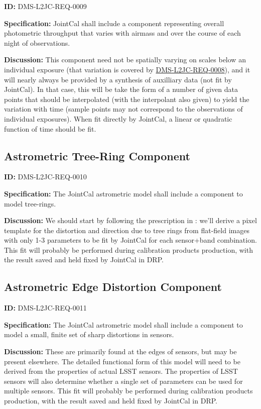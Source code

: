 \documentclass[SE,toc,lsstdraft]{lsstdoc}
\begin{document}
\label{DMS-L2JC-REQ-0009}
\textbf{ID:} DMS-L2JC-REQ-0009

\textbf{Specification:}
JointCal shall include a component representing overall photometric throughput that varies with airmass and over the course of each night of observations.

\textbf{Discussion:}
This component need not be spatially varying on scales below an individual exposure (that variation is covered by \hyperref[DMS-L2JC-REQ-0008]{DMS-L2JC-REQ-0008}), and it will nearly always be provided by a synthesis of auxilliary data (not fit by JointCal).  In that case, this will be take the form of a number of given data points that should be interpolated (with the interpolant also given) to yield the variation with time (sample points may not correspond to the observations of individual exposures).  When fit directly by JointCal, a linear or quadratic function of time should be fit.

\subsection{Astrometric Tree-Ring Component}

\label{DMS-L2JC-REQ-0010}
\textbf{ID:} DMS-L2JC-REQ-0010

\textbf{Specification:}
The JointCal astrometric model shall include a component to model tree-rings.

\textbf{Discussion:}
We should start by following the prescription in \citep{2017PASP..129g4503B}: we'll derive a pixel template for the distortion and direction due to tree rings from flat-field images with only 1-3 parameters to be fit by JointCal for each sensor+band combination.  This fit will probably be performed during calibration products production, with the result saved and held fixed by JointCal in DRP.

\subsection{Astrometric Edge Distortion Component}

\label{DMS-L2JC-REQ-0011}
\textbf{ID:} DMS-L2JC-REQ-0011

\textbf{Specification:}
The JointCal astrometric model shall include a component to model a small, finite set of sharp distortions in sensors.

\textbf{Discussion:}
These are primarily found at the edges of sensors, but may be present elsewhere.  The detailed functional form of this model will need to be derived from the properties of actual LSST sensors.  The properties of LSST sensors will also determine whether a single set of parameters can be used for multiple sensors.  This fit will probably be performed during calibration products production, with the result saved and held fixed by JointCal in DRP.
\end{document}
